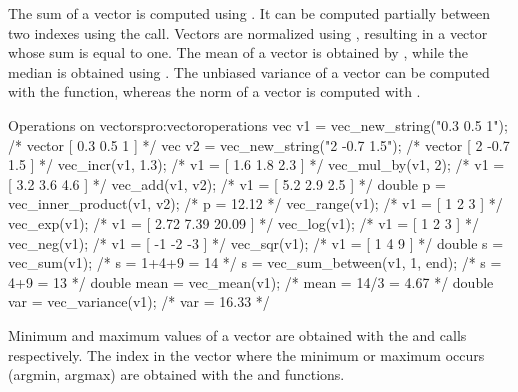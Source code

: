     The sum of a vector is computed using . It
    can be computed partially between two indexes using the
     call. Vectors are normalized using
    , resulting in
    a vector whose sum is equal to one. The mean of a vector is
    obtained by , while
    the median is obtained using . The unbiased variance of
    a vector can be computed with the  function, whereas the
    norm of a vector is computed with .


\begin{program}{Operations on vectors}{pro:vectoroperations}
vec v1 = vec_new_string("0.3 0.5 1");  /* vector [ 0.3 0.5 1 ]     */
vec v2 = vec_new_string("2 -0.7 1.5"); /* vector [ 2 -0.7 1.5 ]    */
vec_incr(v1, 1.3);                     /* v1 = [ 1.6 1.8 2.3 ]     */
vec_mul_by(v1, 2);                     /* v1 = [ 3.2 3.6 4.6 ]     */
vec_add(v1, v2);                       /* v1 = [ 5.2 2.9 2.5 ]     */
double p = vec_inner_product(v1, v2);  /* p = 12.12                */
vec_range(v1);                         /* v1 = [ 1 2 3 ]           */
vec_exp(v1);                           /* v1 = [ 2.72 7.39 20.09 ] */
vec_log(v1);                           /* v1 = [ 1 2 3 ]           */
vec_neg(v1);                           /* v1 = [ -1 -2 -3 ]        */
vec_sqr(v1);                           /* v1 = [ 1 4 9 ]           */
double s = vec_sum(v1);                /* s = 1+4+9 = 14           */
s = vec_sum_between(v1, 1, end);       /* s =   4+9 = 13           */
double mean = vec_mean(v1);            /* mean = 14/3 = 4.67       */
double var = vec_variance(v1);         /* var = 16.33              */
\end{program}

    Minimum and maximum values of a vector are obtained with the
     and  calls
    respectively. The index in the vector where the minimum or maximum
    occurs (argmin, argmax) are obtained with the
     and 
    functions.

